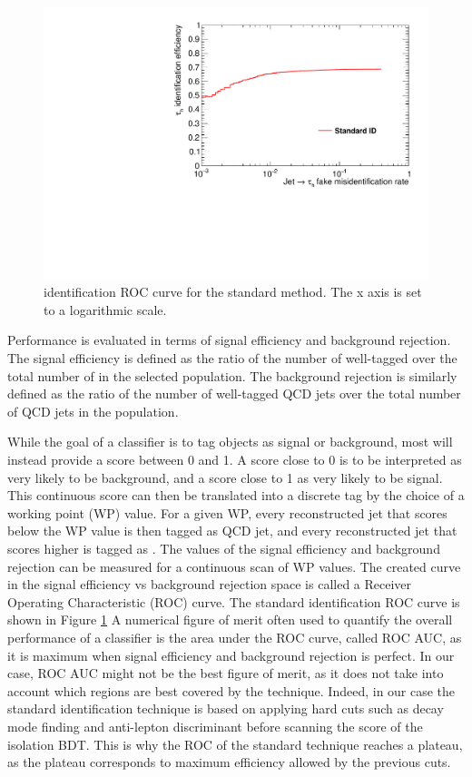 \begin{figure}
    \centering
    \includegraphics[width=\textwidth]{Images/ROC_comp_std.pdf}
    \caption{\tauh identification ROC curve for the standard method. The x axis is set to a logarithmic scale.}
    \label{fig:std_ROC}
\end{figure}

Performance is evaluated in terms of signal efficiency and background rejection. The signal efficiency is defined as the ratio of the number of well-tagged \tauh over the total number of \tauh in the selected population. The background rejection is similarly defined as the ratio of the number of well-tagged QCD jets over the total number of QCD jets in the population.

While the goal of a classifier is to tag objects as signal or background, most will instead provide a score between 0 and 1. A score close to 0 is to be interpreted as very likely to be background, and a score close to 1 as very likely to be signal. This continuous score can then be translated into a discrete tag by the choice of a working point (WP) value. For a given WP, every reconstructed jet that scores below the WP value is then tagged as QCD jet, and every reconstructed jet that scores higher is tagged as \tauh. The values of the signal efficiency and background rejection can be measured for a continuous scan of WP values. The created curve in the signal efficiency vs background rejection space is called a Receiver Operating Characteristic (ROC) curve. The standard identification ROC curve is shown in Figure \ref{fig:std_ROC}
A numerical figure of merit often used to quantify the overall performance of a classifier is the area under the ROC curve, called ROC AUC, as it is maximum when signal efficiency and background rejection is perfect.
In our case, ROC AUC might not be the best figure of merit, as it does not take into account which regions are best covered by the technique. Indeed, in our case the standard identification technique is based on applying hard cuts such as decay mode finding and anti-lepton discriminant before scanning the score of the isolation BDT. This is why the ROC of the standard technique reaches a plateau, as the plateau corresponds to maximum efficiency allowed by the previous cuts.

